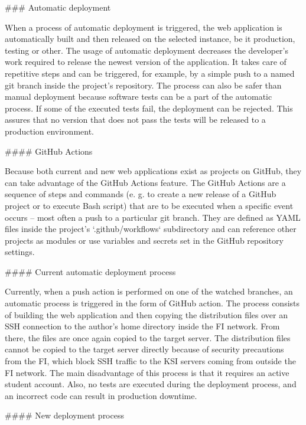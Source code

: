 \documentclass[
  digital, %
  oneside, %
  lof,     %
  nolot,     %
]{fithesis4}
\begin{document}
{### Automatic deployment
\label{chap:autodeploy}

When a process of automatic deployment is triggered, the web application is automatically built and then released on the selected instance, be it production, testing or other. The usage of automatic deployment decreases the developer's work required to release the newest version of the application. It takes care of repetitive steps and can be triggered, for example, by a simple push to a named git branch inside the project's repository. The process can also be safer than manual deployment because software tests can be a part of the automatic process. If some of the executed tests fail, the deployment can be rejected. This assures that no version that does not pass the tests will be released to a production environment.

#### GitHub Actions

Because both current and new web applications exist as projects on GitHub, they can take advantage of the GitHub Actions feature. The GitHub Actions are a sequence of steps and commands (e. g. to create a new release of a GitHub project or to execute Bash script) that are to be executed when a specific event occurs -- most often a push to a particular git branch. They are defined as YAML files inside the project's `.github/workflows` subdirectory and can reference other projects as modules or use variables and secrets set in the GitHub repository settings.

#### Current automatic deployment process

Currently, when a push action is performed on one of the watched branches, an automatic process is triggered in the form of GitHub action. The process consists of building the web application and then copying the distribution files over an SSH connection to the author's home directory inside the FI network. From there, the files are once again copied to the target server. The distribution files cannot be copied to the target server directly because of security precautions from the FI, which block SSH traffic to the KSI servers coming from outside the FI network. The main disadvantage of this process is that it requires an active student account. Also, no tests are executed during the deployment process, and an incorrect code can result in production downtime.

#### New deployment process

}
\end{document}
